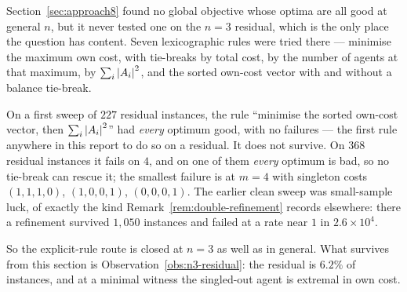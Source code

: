 \begin{remark}[No explicit rule solves the $n = 3$ residual either]
\label{rem:n3-rules-fail}
Section~\ref{sec:approach8} found no global objective whose optima are all good at
general $n$, but it never tested one on the $n = 3$ residual, which is the only
place the question has content. Seven lexicographic rules were tried there ---
minimise the maximum own cost, with tie-breaks by total cost, by the number of
agents at that maximum, by $\sum_i \left\lvert A_{i}\right\rvert^2$, and the sorted own-cost
vector with and without a balance tie-break.

On a first sweep of $227$ residual instances, the rule ``minimise the sorted
own-cost vector, then $\sum_i \left\lvert A_{i}\right\rvert^2$'' had \emph{every} optimum good,
with no failures --- the first rule anywhere in this report to do so on a
residual. It does not survive. On $368$ residual instances it fails on $4$, and on
one of them \emph{every} optimum is bad, so no tie-break can rescue it; the
smallest failure is at $m = 4$ with singleton costs $(1,1,1,0)$, $(1,0,0,1)$,
$(0,0,0,1)$. The earlier clean sweep was small-sample luck, of exactly the kind
Remark~\ref{rem:double-refinement} records elsewhere: there a refinement survived
$1{,}050$ instances and failed at a rate near $1$ in $2.6 \times 10^{4}$.

So the explicit-rule route is closed at $n = 3$ as well as in general. What
survives from this section is Observation~\ref{obs:n3-residual}: the residual is
$6.2\%$ of instances, and at a minimal witness the singled-out agent is extremal
in own cost.
\end{remark}
